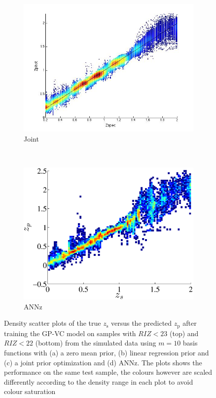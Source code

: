 \documentclass[useAMS,usenatbib,fleqn]{mn2e}
\begin{document}
\begin{figure}
\begin{subfigure}[b]{0.24\textwidth}
                \includegraphics[width=\textwidth]{figures/22_J}
                \caption{Joint}
        \end{subfigure}
       ~
        \begin{subfigure}[b]{0.24\textwidth}
                \includegraphics[width=\textwidth]{figures/ANN_22}
                \caption{{\sc ANNz}}
        \end{subfigure}
        
        \caption{Density scatter plots of the true $z_\textrm{s}$ versus the predicted $z_\textrm{p}$ after training the GP-VC model on samples with $RIZ<23$ (top) and $RIZ<22$ (bottom) from the simulated data using $m=10$ basis functions with (a) a zero mean prior, (b) linear regression prior and (c) a joint prior optimization and (d) {\sc ANNz}. The plots shows the performance on the same test sample, the colours however are scaled differently according to the density range in each plot to avoid colour saturation}
        \label{fig-RIZ-splits}
\end{figure}
\end{document}
